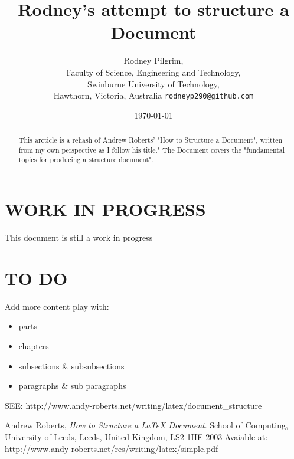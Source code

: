 \documentclass{article}
\begin{document}
\title{Rodney's attempt to structure a \Latex{} Document}
\author{Rodney Pilgrim,\\
	Faculty of Science, Engineering and Technology,\\
	Swinburne University of Technology,\\
	Hawthorn,
	Victoria, 
	Australia
	\texttt{rodneyp290@github.com}}
\date{\today}
\maketitle

\begin{abstract}
This arcticle is a rehash of Andrew Roberts' "How to Structure a \Latex{} Document",\cite{roberts2003}
written from my own perspective as I follow his title." The Document covers the "fundamental topics for
producing a structure document"\cite{roberts2003}.
\end{abstract}

\section{WORK IN PROGRESS}
This document is still a work in progress

\section{TO DO}
Add more content 
play with:
\begin{itemize}
 \item parts
 \item chapters
 \item subsections & subsubsections
 \item paragraphs & sub paragraphs
\end{itemize}

SEE: http://www.andy-roberts.net/writing/latex/document\_structure

\begin{thebibliography}{9}

	  Andrew Roberts,
	  \emph{How to Structure a \LaTeX{} Document}.
	  School of Computing, University of Leeds, Leeds, United Kingdom, LS2 1HE
	  2003
	  Avaiable at: http://www.andy-roberts.net/res/writing/latex/simple.pdf

\end{thebibliography}
\end{document}
